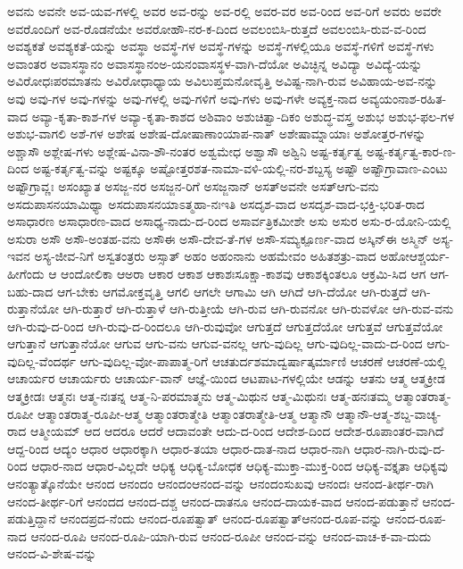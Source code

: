 {ಅವನು
ಅವನೇ
ಅವ-ಯವ-ಗಳಲ್ಲಿ
ಅವರ
ಅವ-ರನ್ನು
ಅವ-ರಲ್ಲಿ
ಅವರ-ವರ
ಅವ-ರಿಂದ
ಅವ-ರಿಗೆ
ಅವರು
ಅವರೇ
ಅವರೊಂದಿಗೆ
ಅವ-ರೊಡನೆಯೇ
ಅವರೋಹೌ-ನರ-ಕ-ದಿಂದ
ಅವಲಂಬಿಸಿ-ರುತ್ತದೆ
ಅವಲಂಬಿಸಿ-ರುವ-ವ-ರಿಂದ
ಅವಶ್ಯಕತೆ
ಅವಶ್ಯಕತೆ-ಯನ್ನು
ಅವಸ್ಥಾ
ಅವಸ್ಥೆ-ಗಳ
ಅವಸ್ಥೆ-ಗಳನ್ನು
ಅವಸ್ಥೆ-ಗಳಲ್ಲಿಯೂ
ಅವಸ್ಥೆ-ಗಳಿಗೆ
ಅವಸ್ಥೆ-ಗಳು
ಅವಾಂತರ
ಅವಾಸಸ್ಥಾನಂ
ಅವಾಸಸ್ಥಾನಂಅ-ಯನಂವಾಸಸ್ಥಳ-ವಾಗಿ-ದೆಯೋ
ಅವಿಚ್ಛಿನ್ನ
ಅವಿದ್ಯಾ
ಅವಿದ್ಯೆ-ಯನ್ನು
ಅವಿರೋಧಃಪರಮಾತನು
ಅವಿರೋಧಾಧ್ಯಾಯ
ಅವಿಲುಪ್ತಮನೋವೃತ್ತಿ
ಅವಿಷ್ಟ-ನಾಗಿ-ರುವ
ಅವಿಹಾಯ-ಅವ-ನನ್ನು
ಅವು
ಅವು-ಗಳ
ಅವು-ಗಳನ್ನು
ಅವು-ಗಳಲ್ಲಿ
ಅವು-ಗಳಿಗೆ
ಅವು-ಗಳು
ಅವು-ಗಳೇ
ಅವ್ಯಕ್ತ-ನಾದ
ಅವ್ಯಯಂನಾಶ-ರಹಿತ-ವಾದ
ಅವ್ಯಾ-ಕೃತಾ-ಕಾಶ-ಗಳ
ಅವ್ಯಾ-ಕೃತಾ-ಕಾಶದ
ಅಶಿವಾಂ
ಅಶುಚಿತ್ವಾ-ದಿಕಂ
ಅಶುದ್ಧ-ವಸ್ತ್ರ
ಅಶುಭ
ಅಶುಭ-ಫಲ-ಗಳ
ಅಶುಭ-ವಾಗಲಿ
ಅಶೆ-ಗಳ
ಅಶೇಷ
ಅಶೇಷ-ದೋಷಾಣಾಂಯಾಪ-ನಾತ್
ಅಶೇಷಾಮ್ನಾಯಾಃ
ಅಶೋತ್ತರ-ಗಳನ್ನು
ಅಶ್ಚಾಸೌ
ಅಶ್ಲೇಷ-ಗಳು
ಅಶ್ಲೇಷ-ವಿನಾ-ಶೌ-ನಂತರ
ಅಶ್ವಮೇಧ
ಅಶ್ವಾಸೌ
ಅಶ್ವಿನಿ
ಅಷ್ಟ-ಕರ್ತೃತ್ವ
ಅಷ್ಟ-ಕರ್ತೃತ್ವ-ಕಾರ-ಣ-ದಿಂದ
ಅಷ್ಟ-ಕರ್ತೃತ್ವ-ವನ್ನು
ಅಷ್ಟಕ್ಕೂ
ಅಷ್ಟೋತ್ತರಶತ-ನಾಮಾ-ವಳಿ-ಯಲ್ಲಿ-ನರ-ಶಬ್ದಸ್ಯ
ಅಷ್ಟೌ
ಅಷ್ಟೌಗ್ರಾವಾಣ-ಎಂಟು
ಅಷ್ಟೌಗ್ರಾವ್ಣಃ
ಅಸಂಖ್ಯಾತ
ಅಸಜ್ಜ-ನರ
ಅಸಜ್ಜನ-ರಿಗೆ
ಅಸಜ್ಜನಾನ್
ಅಸತ್ಅವನೇ
ಅಸತ್ಆಗು-ವನು
ಅಸದುಪಾಸನಯಾಮಿಥ್ಯಾ
ಅಸದುಪಾಸನಯಾಽತ್ಮಹಾ-ನಃಇತಿ
ಅಸದೃಶ-ವಾದ
ಅಸದೃಶ-ವಾದ-ಭಕ್ತಿ-ಭರಿತ-ರಾದ
ಅಸಾಧಾರಣ
ಅಸಾಧಾರಣ-ವಾದ
ಅಸಾಧ್ಯ-ನಾದು-ದ-ರಿಂದ
ಅಸಾರ್ವತ್ರಿಕಮೀಶೇ
ಅಸು
ಅಸುರ
ಅಸು-ರ-ಯೋನಿ-ಯಲ್ಲಿ
ಅಸುರಾ
ಅಸೌ
ಅಸೌ-ಅಂತಹ-ವನು
ಅಸೌಈ
ಅಸೌ-ದೇವ-ತೆ-ಗಳ
ಅಸೌ-ಸಮ್ಯಕ್ಪೂರ್ಣ-ವಾದ
ಅಸ್ಕಿನ್ಈ
ಅಸ್ಮಿನ್
ಅಸ್ಯ-ಇವನ
ಅಸ್ಯ-ಜೀವ-ನಿಗೆ
ಅಸ್ವತಂತ್ರರು
ಅಸ್ಸಾತ್
ಅಹಂ
ಅಹಂನಾನು
ಅಹಮೇವಂ
ಅಹಿತಶತ್ರು-ವಾದ
ಅಹೋಆಶ್ಚರ್ಯ-ಹೀಗೆಂದು
ಆ
ಆಂದೋಲಿಕಾ
ಆಅರಾ
ಆಕಾರ
ಆಕಾಶ
ಆಕಾಶಃಸೂಕ್ಷಾ-ಕಾಶವು
ಆಕಾಶಕ್ಕಿಂತಲೂ
ಆಕ್ರಮಿ-ಸಿದ
ಆಗ
ಆಗ-ಬಹು-ದಾದ
ಆಗ-ಬೇಕು
ಆಗಮೋಕ್ತವೃತ್ತಿ
ಆಗಲಿ
ಆಗಲೇ
ಆಗಾಮಿ
ಆಗಿ
ಆಗಿದೆ
ಆಗಿ-ದೆಯೋ
ಆಗಿ-ರುತ್ತದೆ
ಆಗಿ-ರುತ್ತಾನೆಯೋ
ಆಗಿ-ರುತ್ತಾರೆ
ಆಗಿ-ರುತ್ತಾಳೆ
ಆಗಿ-ರುತ್ತೀಯೆ
ಆಗಿ-ರುವ
ಆಗಿ-ರುವನೋ
ಆಗಿ-ರುವಳೋ
ಆಗಿ-ರುವ-ವನು
ಆಗಿ-ರುವು-ದ-ರಿಂದ
ಆಗಿ-ರುವು-ದ-ರಿಂದಲೂ
ಆಗಿ-ರುವುವೋ
ಆಗುತ್ತದೆ
ಆಗುತ್ತದೆಯೋ
ಆಗುತ್ತವೆ
ಆಗುತ್ತವೆಯೋ
ಆಗುತ್ತಾನೆ
ಆಗುತ್ತಾನೆಯೋ
ಆಗುವ
ಆಗು-ವನು
ಆಗುವ-ವನಲ್ಲ
ಆಗು-ವುದಿಲ್ಲ
ಆಗು-ವುದಿಲ್ಲ-ವಾದು-ದ-ರಿಂದ
ಆಗು-ವುದಿಲ್ಲ-ವೆಂದರ್ಥ
ಆಗು-ವುದಿಲ್ಲ-ವೋ-ಪಾಪಾತ್ಮ-ರಿಗೆ
ಆಚತುರ್ದಶಮಾದ್ವರ್ಷಾತ್ಕರ್ಮಾಣಿ
ಆಚರಣೆ
ಆಚರಣೆ-ಯಲ್ಲಿ
ಆಚಾರ್ಯರ
ಆಚಾರ್ಯರು
ಆಚಾರ್ಯ-ವಾನ್
ಆಜ್ಞೆ-ಯಿಂದ
ಆಟಪಾಟ-ಗಳಲ್ಲಿಯೇ
ಆಡನ್ನು
ಆತನು
ಆತ್ಮ
ಆತ್ಮಕ್ರೀಡ
ಆತ್ಮಕ್ರೀಡಃ
ಆತ್ಮನಃ
ಆತ್ಮ-ನಃತನ್ನ
ಆತ್ಮ-ನಿ-ಪರಮಾತ್ಮನು
ಆತ್ಮ-ಮಿಥುನ
ಆತ್ಮ-ಮಿಥುನಃ
ಆತ್ಮ-ಹನಃತಮ್ಮ
ಆತ್ಮಾಂತರಾತ್ಮ-ರೂಪೀ
ಆತ್ಮಾಂತರಾತ್ಮ-ರೂಪೀ-ಆತ್ಮ
ಆತ್ಮಾಂತರಾತ್ಮೇತಿ
ಆತ್ಮಾಂತರಾತ್ಮೇತಿ-ಆತ್ಮ
ಆತ್ಮಾನೌ
ಆತ್ಮಾನೌ-ಆತ್ಮ-ಶಬ್ದ-ವಾಚ್ಯ-ರಾದ
ಆತ್ಮೀಯಮ್
ಆದ
ಆದರೂ
ಆದರೆ
ಆದಾವಂತೇ
ಆದು-ದ-ರಿಂದ
ಆದೇಶ-ದಿಂದ
ಆದೇಶ-ರೂಪಾಂತರ-ವಾಗಿದೆ
ಆದ್ದ-ರಿಂದ
ಆದ್ಯಂ
ಆಧಾರ
ಆಧಾರಕ್ಕಾಗಿ
ಆಧಾರ-ತಯಾ
ಆಧಾರ-ದಾತ-ನಾದ
ಆಧಾರ-ನಾಗಿ
ಆಧಾರ-ನಾಗಿ-ರುವು-ದ-ರಿಂದ
ಆಧಾರ-ನಾದ
ಆಧಾರ-ವಿಲ್ಲದೇ
ಆಧಿಕ್ಯ
ಆಧಿಕ್ಯ-ಬೋಧಕ
ಆಧಿಕ್ಯ-ಮುಕ್ತಾ-ಮುಕ್ತ-ರಿಂದ
ಆಧಿಕ್ಯ-ವಕ್ತೃತಾ
ಆಧಿಕ್ಯವು
ಆನಂತ್ಯಾತ್ಕೊನೆಯೇ
ಆನಂದ
ಆನಂದಂ
ಆನಂದಂಆನಂದ-ವನ್ನು
ಆನಂದಂಸುಖವು
ಆನಂದಃ
ಆನಂದ-ತೀರ್ಥ-ರಾಗಿ
ಆನಂದ-ತೀರ್ಥ-ರಿಗೆ
ಆನಂದದ
ಆನಂದ-ದಶ್ಚ
ಆನಂದ-ದಾತನೂ
ಆನಂದ-ದಾಯಕ-ವಾದ
ಆನಂದ-ಪಡುತ್ತಾನೆ
ಆನಂದ-ಪಡುತ್ತಿದ್ದಾನೆ
ಆನಂದಪ್ರದ-ನೆಂದು
ಆನಂದ-ರೂಪತ್ವಾತ್
ಆನಂದ-ರೂಪತ್ವಾತ್ಆನಂದ-ರೂಪ-ವನ್ನು
ಆನಂದ-ರೂಪ-ನಾದ
ಆನಂದ-ರೂಪಿ
ಆನಂದ-ರೂಪಿ-ಯಾಗಿ-ರುವ
ಆನಂದ-ರೂಪೀ
ಆನಂದ-ವನ್ನು
ಆನಂದ-ವಾಚ-ಕ-ವಾ-ದುದು
ಆನಂದ-ವಿ-ಶೇಷ-ವನ್ನು
}
